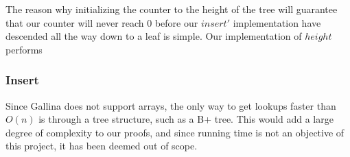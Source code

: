 The reason why initializing the counter to the height of the tree will guarantee that our counter will never reach $0$ before our $insert'$ implementation have descended all the way down to a leaf is simple. Our implementation of $height$ performs 

\subsubsection{Insert}
Since Gallina does not support arrays, the only way to get lookups faster than $O(n)$ is through a tree structure, such as a B+ tree. This would add a large degree of complexity to our proofs, and since running time is not an objective of this project, it has been deemed out of scope.

\paragraph{}
